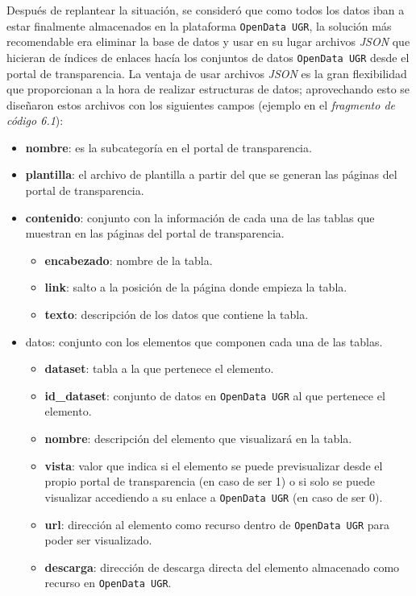 Después de replantear la situación, se consideró que como todos los datos iban a estar finalmente almacenados en la plataforma {\tt OpenData UGR}, la solución más recomendable era eliminar la base de datos y usar en su lugar archivos \textit{JSON} que hicieran de índices de enlaces hacía los conjuntos de datos {\tt OpenData UGR} desde el portal de transparencia. La ventaja de usar archivos \textit{JSON} es la gran flexibilidad que proporcionan a la hora de realizar estructuras de datos; aprovechando esto se diseñaron estos archivos con los siguientes campos (ejemplo en el \textit{fragmento de código 6.1}):

\begin{itemize}
	\item \textbf{nombre}: es la subcategoría en el portal de transparencia.
	\item \textbf{plantilla}: el archivo de plantilla a partir del que se generan las páginas del portal de transparencia.
	\item \textbf{contenido}: conjunto con la información de cada una de las tablas que muestran en las páginas del portal de transparencia.
	\begin{itemize}
		\item \textbf{encabezado}: nombre de la tabla.
		\item \textbf{link}: salto a la posición de la página donde empieza la tabla.
		\item \textbf{texto}: descripción de los datos que contiene la tabla.
	\end{itemize}
	\item datos: conjunto con los elementos que componen cada una de las tablas.
	\begin{itemize}
		\item \textbf{dataset}: tabla a la que pertenece el elemento.
		\item \textbf{id\_dataset}: conjunto de datos en {\tt OpenData UGR} al que pertenece el elemento.
		\item \textbf{nombre}: descripción del elemento que visualizará en la tabla.
		\item \textbf{vista}: valor que indica si el elemento se puede previsualizar desde el propio portal de transparencia (en caso de ser 1) o si solo se puede visualizar accediendo a su enlace a {\tt OpenData UGR} (en caso de ser 0).
		\item \textbf{url}: dirección al elemento como recurso dentro de {\tt OpenData UGR} para poder ser visualizado.
		\item \textbf{descarga}: dirección de descarga directa del elemento almacenado como recurso en {\tt OpenData UGR}.
	\end{itemize}
\end{itemize}

